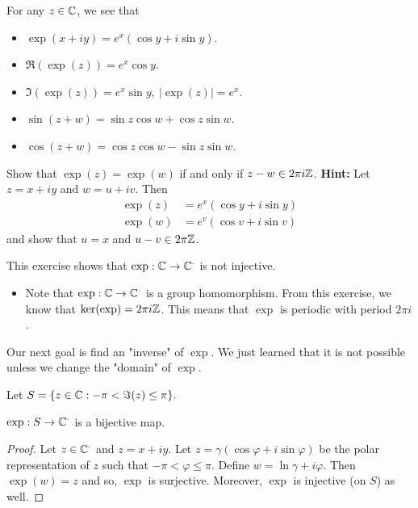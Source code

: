 \documentclass[a4paper]{report}
\begin{document}
\begin{corollary}
    For any \( z \in \mathbb{C}  \), we see that 
    \begin{itemize}
        \item \( \exp(x + iy) = e^{x} (\cos y + i \sin y) \).  
        \item \( \Re(\exp(z)) = e^{x} \cos y \).
        \item \( \Im(\exp(z)) = e^{x} \sin y, \ | \exp(z) |  = e^{x} \).
        \item \( \sin(z +w) = \sin z \cos w + \cos z \sin w \).
        \item  \( \cos(z + w) = \cos z \cos w - \sin z \sin w  \).
    \end{itemize}
\end{corollary}

\begin{prop}
   Show that \( \exp(z) = \exp(w) \) if and only if \( z - w \in 2 \pi i \mathbb{Z}  \). 
   \textbf{Hint:} Let \( z = x + iy \) and \( w = u + i v \). Then 
   \begin{align*}
       \exp(z) &= e^{x} (\cos y + i \sin y) \\
       \exp(w) &= e^{v} (\cos v + i \sin v)
   \end{align*}
   and show that \( u  = x  \) and \(  u - v \in 2 \pi \mathbb{Z}  \).
\end{prop} 

\begin{remark}
    This exercise shows that \( \exp: \mathbb{C} \to \mathbb{C}^{\cdot} \) is not injective.
    \begin{itemize}
        \item Note that \( \exp: \mathbb{C} \to \mathbb{C}^{\cdot} \) is a group homomorphism. From this exercise, we know that \( \ker(\exp) = 2\pi i \mathbb{Z}  \). This means that \( \exp  \) is periodic with period \( 2 \pi i  \). 
    \end{itemize}
\end{remark}

Our next goal is find an "inverse" of \( \exp \). We just learned that it is not possible unless we change the "domain" of \( \exp \).

Let \( S = \{ z \in \mathbb{C} : -\pi < \Im(z) \leq \pi \}. \)

\begin{lemma}
   \( \exp: S \to \mathbb{C}^{\cdot} \) is a bijective map. 
\end{lemma}
\begin{proof}
Let \( z \in \mathbb{C}^{\cdot} \) and \( z = x + iy \). Let \( z = \gamma (\cos \varphi + i \sin \varphi) \) be the polar representation of \( z  \) such that \( -\pi < \varphi \leq \pi \). Define \( w = \ln \gamma + i \varphi \). Then \( \exp(w) = z  \) and so, \( \exp  \) is surjective. Moreover, \( \exp  \) is injective (on \( S \)) as well.
\end{proof}
\end{document}
